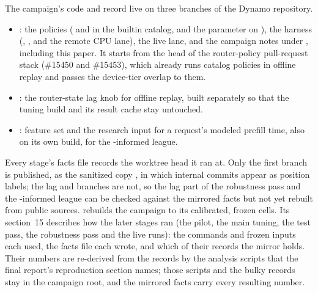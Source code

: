 The campaign's code and record live on three branches of the Dynamo repository.
\begin{itemize}
  \item {}: the policies (\lc{} and  in the builtin
    catalog, and the  parameter on ), the harness (,
    ,  and the remote CPU lane), the live lane, and the campaign notes
    under , including this paper. It starts from the head of the
    router-policy pull-request stack (\#15450 and \#15453), which already runs catalog policies in
    offline replay and passes the device-tier overlap to them.
  \item {}: the router-state lag knob for offline replay, built
    separately so that the tuning build and its result cache stay untouched.
  \item {}: feature set  and the research input for a
    request's modeled prefill time, also on its own build, for the \ais{}-informed league.
\end{itemize}
Every stage's facts file records the worktree head it ran at. Only the first branch is published,
as the sanitized copy , in which internal commits appear as
position labels; the lag and \ais{} branches are not, so the lag part of the robustness pass
and the \ais{}-informed league can be checked against the mirrored facts but not yet rebuilt from public
sources.
 rebuilds the campaign to its calibrated, frozen cells. Its section~15 describes
how the later stages ran (the pilot, the main tuning, the test pass, the robustness pass and the
live runs): the commands and frozen inputs each used, the facts file each wrote, and which of their
records the mirror holds. Their numbers are re-derived from the records by the analysis scripts that the final
report's reproduction section names; those scripts and the bulky records stay in the campaign root,
and the mirrored facts carry every resulting number.

